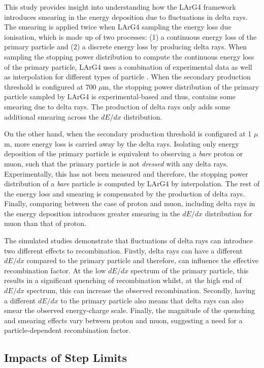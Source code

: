 This study provides insight into understanding how the LArG4 framework introduces smearing in the energy deposition due to fluctuations in delta rays.
The smearing is applied twice when LArG4 sampling the energy loss due ionisation, which is made up of two processes: (1) a continuous energy loss of the primary particle and (2) a discrete energy loss by producing delta rays.
When sampling the stopping power distribution to compute the continuous energy loss of the primary particle, LArG4 uses a combination of experimental data as well as interpolation for different types of particle \cite{}. 
When the secondary production threshold is configured at 700 $\mu$m, the stopping power distribution of the primary particle sampled by LArG4 is experimental-based and thus, contains some smearing due to delta rays.
The production of delta rays only adds some additional smearing across the $dE/dx$ distribution. 

On the other hand, when the secondary production threshold is configured at 1 $\mu$m, more energy loss is carried away by the delta rays. 
Isolating only energy deposition of the primary particle is equivalent to observing a \textit{bare} proton or muon, such that the primary particle is not \textit{dressed} with any delta rays. 
Experimentally, this has not been measured and therefore, the stopping power distribution of a \textit{bare} particle is computed by LArG4 by interpolation.
The rest of the energy loss and smearing is compensated by the production of delta rays.
Finally, comparing between the case of proton and muon, including delta rays in the energy deposition introduces greater smearing in the $dE/dx$ distribution for muon than that of proton.

The simulated studies demonstrate that fluctuations of delta rays can introduce two different effects to recombination.
Firstly, delta rays can have a different $dE/dx$ compared to the primary particle and therefore, can influence the effective recombination factor.
At the low $dE/dx$ spectrum of the primary particle, this results in a significant quenching of recombination whilst, at the high end of $dE/dx$ spectrum, this can increase the observed recombination.
Secondly, having a different $dE/dx$ to the primary particle also means that delta rays can also smear the observed energy-charge scale.
Finally, the magnitude of the quenching and smearing effects vary between proton and muon, suggesting a need for a particle-dependent recombination factor.   

\subsection{Impacts of Step Limits}
\label{sec:impactStepLimit}

